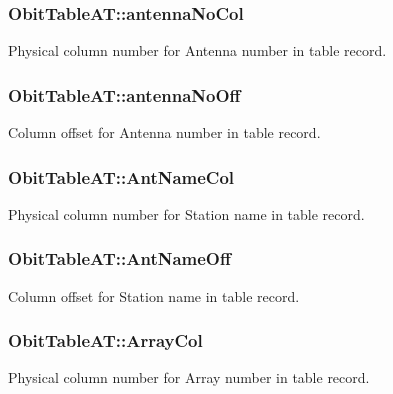 \subsubsection{ {\bf Obit\-Table\-AT::antenna\-No\-Col}}\label{structObitTableAT_o33}


Physical column number for Antenna number in table record. 

\subsubsection{ {\bf Obit\-Table\-AT::antenna\-No\-Off}}\label{structObitTableAT_o32}


Column offset for Antenna number in table record. 

\subsubsection{ {\bf Obit\-Table\-AT::Ant\-Name\-Col}}\label{structObitTableAT_o43}


Physical column number for Station name in table record. 

\subsubsection{ {\bf Obit\-Table\-AT::Ant\-Name\-Off}}\label{structObitTableAT_o42}


Column offset for Station name in table record. 

\subsubsection{ {\bf Obit\-Table\-AT::Array\-Col}}\label{structObitTableAT_o35}


Physical column number for Array number in table record. 

